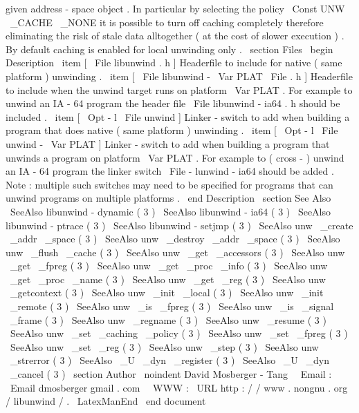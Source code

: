 given
address
-
space
object
.
In
particular
by
selecting
the
policy
\
Const
{
UNW
\
_CACHE
\
_NONE
}
it
is
possible
to
turn
off
caching
completely
therefore
eliminating
the
risk
of
stale
data
alltogether
(
at
the
cost
of
slower
execution
)
.
By
default
caching
is
enabled
for
local
unwinding
only
.
\
section
{
Files
}
\
begin
{
Description
}
\
item
[
\
File
{
libunwind
.
h
}
]
Headerfile
to
include
for
native
(
same
platform
)
unwinding
.
\
item
[
\
File
{
libunwind
-
}
\
Var
{
PLAT
}
\
File
{
.
h
}
]
Headerfile
to
include
when
the
unwind
target
runs
on
platform
\
Var
{
PLAT
}
.
For
example
to
unwind
an
IA
-
64
program
the
header
file
\
File
{
libunwind
-
ia64
.
h
}
should
be
included
.
\
item
[
\
Opt
{
-
l
}
\
File
{
unwind
}
]
Linker
-
switch
to
add
when
building
a
program
that
does
native
(
same
platform
)
unwinding
.
\
item
[
\
Opt
{
-
l
}
\
File
{
unwind
-
}
\
Var
{
PLAT
}
]
Linker
-
switch
to
add
when
building
a
program
that
unwinds
a
program
on
platform
\
Var
{
PLAT
}
.
For
example
to
(
cross
-
)
unwind
an
IA
-
64
program
the
linker
switch
\
File
{
-
lunwind
-
ia64
}
should
be
added
.
Note
:
multiple
such
switches
may
need
to
be
specified
for
programs
that
can
unwind
programs
on
multiple
platforms
.
\
end
{
Description
}
\
section
{
See
Also
}
\
SeeAlso
{
libunwind
-
dynamic
(
3
)
}
\
SeeAlso
{
libunwind
-
ia64
(
3
)
}
\
SeeAlso
{
libunwind
-
ptrace
(
3
)
}
\
SeeAlso
{
libunwind
-
setjmp
(
3
)
}
\
SeeAlso
{
unw
\
_create
\
_addr
\
_space
(
3
)
}
\
SeeAlso
{
unw
\
_destroy
\
_addr
\
_space
(
3
)
}
\
SeeAlso
{
unw
\
_flush
\
_cache
(
3
)
}
\
SeeAlso
{
unw
\
_get
\
_accessors
(
3
)
}
\
SeeAlso
{
unw
\
_get
\
_fpreg
(
3
)
}
\
SeeAlso
{
unw
\
_get
\
_proc
\
_info
(
3
)
}
\
SeeAlso
{
unw
\
_get
\
_proc
\
_name
(
3
)
}
\
SeeAlso
{
unw
\
_get
\
_reg
(
3
)
}
\
SeeAlso
{
unw
\
_getcontext
(
3
)
}
\
SeeAlso
{
unw
\
_init
\
_local
(
3
)
}
\
SeeAlso
{
unw
\
_init
\
_remote
(
3
)
}
\
SeeAlso
{
unw
\
_is
\
_fpreg
(
3
)
}
\
SeeAlso
{
unw
\
_is
\
_signal
\
_frame
(
3
)
}
\
SeeAlso
{
unw
\
_regname
(
3
)
}
\
SeeAlso
{
unw
\
_resume
(
3
)
}
\
SeeAlso
{
unw
\
_set
\
_caching
\
_policy
(
3
)
}
\
SeeAlso
{
unw
\
_set
\
_fpreg
(
3
)
}
\
SeeAlso
{
unw
\
_set
\
_reg
(
3
)
}
\
SeeAlso
{
unw
\
_step
(
3
)
}
\
SeeAlso
{
unw
\
_strerror
(
3
)
}
\
SeeAlso
{
\
_U
\
_dyn
\
_register
(
3
)
}
\
SeeAlso
{
\
_U
\
_dyn
\
_cancel
(
3
)
}
\
section
{
Author
}
\
noindent
David
Mosberger
-
Tang
\
\
Email
:
\
Email
{
dmosberger
gmail
.
com
}
\
\
WWW
:
\
URL
{
http
:
/
/
www
.
nongnu
.
org
/
libunwind
/
}
.
\
LatexManEnd
\
end
{
document
}
